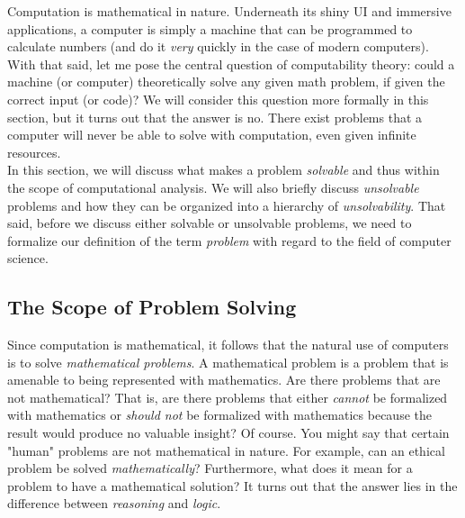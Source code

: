 
Computation is mathematical in nature. Underneath its shiny UI and immersive applications, a computer is simply a machine that can be programmed to calculate numbers (and do it \textit{very} quickly in the case of modern computers). With that said, let me pose the central question of computability theory: could a machine (or computer) theoretically solve any given math problem, if given the correct input (or code)? We will consider this question more formally in this section, but it turns out that the answer is no. There exist problems that a computer will never be able to solve with computation, even given infinite resources. \\

In this section, we will discuss what makes a problem \textit{solvable} and thus within the scope of computational analysis. We will also briefly discuss \textit{unsolvable} problems and how they can be organized into a hierarchy of \textit{unsolvability}. That said, before we discuss either solvable or unsolvable problems, we need to formalize our definition of the term \textit{problem} with regard to the field of computer science. \\


\subsection{The Scope of Problem Solving}




Since computation is mathematical, it follows that the natural use of computers is to solve \textit{mathematical problems}. A mathematical problem is a problem that is amenable to being represented with mathematics. Are there problems that are not mathematical? That is, are there problems that either \textit{cannot} be formalized with mathematics or \textit{should not} be formalized with mathematics because the result would produce no valuable insight? Of course. You might say that certain "human" problems are not mathematical in nature. For example, can an ethical problem be solved \textit{mathematically}? Furthermore, what does it mean for a problem to have a mathematical solution? It turns out that the answer lies in the difference between \textit{reasoning} and \textit{logic}. \\

